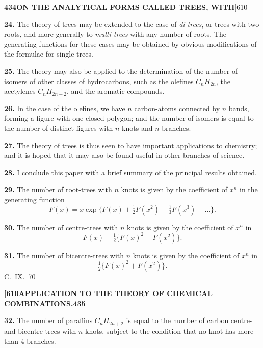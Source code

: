 \documentclass[11pt,a4paper]{article}
\begin{document}
{\newpage
\noindent\textbf{434}\hspace{\fill}\textbf{ON THE ANALYTICAL FORMS CALLED TREES, WITH}\hspace{\fill}[610

\noindent\textbf{24.}
The theory of trees may be extended to the case of \textit{di-trees}, or trees with two roots, and more generally to \textit{multi-trees} with any number of roots. The generating functions for these cases may be obtained by obvious modifications of the formulae for single trees.

\medskip
\noindent\textbf{25.}
The theory may also be applied to the determination of the number of isomers of other classes of hydrocarbons, such as the olefines $C_nH_{2n}$, the acetylenes $C_nH_{2n-2}$, and the aromatic compounds.

\medskip
\noindent\textbf{26.}
In the case of the olefines, we have $n$ carbon-atoms connected by $n$ bands, forming a figure with one closed polygon; and the number of isomers is equal to the number of distinct figures with $n$ knots and $n$ branches.

\medskip
\noindent\textbf{27.}
The theory of trees is thus seen to have important applications to chemistry; and it is hoped that it may also be found useful in other branches of science.

\medskip
\noindent\textbf{28.}
I conclude this paper with a brief summary of the principal results obtained.

\medskip
\noindent\textbf{29.}
The number of root-trees with $n$ knots is given by the coefficient of $x^n$ in the generating function
\[
F(x) = x \exp\{F(x) + \tfrac{1}{2}F(x^2) + \tfrac{1}{3}F(x^3) + \ldots\}.
\]

\medskip
\noindent\textbf{30.}
The number of centre-trees with $n$ knots is given by the coefficient of $x^n$ in
\[
F(x) - \tfrac{1}{2}\{F(x)^2 - F(x^2)\}.
\]

\medskip
\noindent\textbf{31.}
The number of bicentre-trees with $n$ knots is given by the coefficient of $x^n$ in
\[
\tfrac{1}{2}\{F(x)^2 + F(x^2)\}.
\]
\hfill C.~IX.\ 70

\newpage
\noindent\textbf{[610}\hspace{\fill}\textbf{APPLICATION TO THE THEORY OF CHEMICAL COMBINATIONS.}\hspace{\fill}\textbf{435}

\noindent\textbf{32.}
The number of paraffins $C_nH_{2n+2}$ is equal to the number of carbon centre- and bicentre-trees with $n$ knots, subject to the condition that no knot has more than 4 branches.

}
\end{document}
